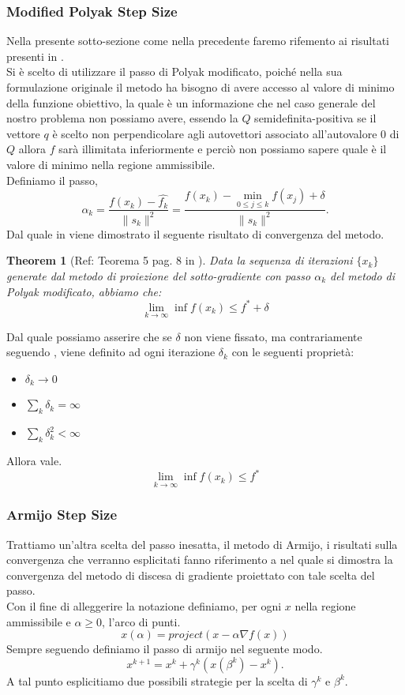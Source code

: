 \documentclass[12pt]{extarticle}
\newtheorem{theorem}{Theorem}[section]
\begin{document}
\subsubsection{Modified Polyak Step Size}
Nella presente sotto-sezione come nella precedente faremo rifemento ai risultati presenti in \cite{sgd_notes}.\\
Si è scelto di utilizzare il passo di Polyak modificato, poiché nella sua formulazione originale il metodo ha bisogno di avere accesso al valore di minimo della funzione obiettivo, la quale è un informazione che nel caso generale del nostro problema non possiamo avere, essendo la $Q$ semidefinita-positiva se il vettore $q$ è scelto non perpendicolare agli autovettori associato all'autovalore 0 di $Q$ allora $f$ sarà illimitata inferiormente e perciò non possiamo sapere quale è il valore di minimo nella regione ammissibile.\\
Definiamo il passo,
\[\alpha_k = \frac{f(x_k) - \hat{f_k}}{\|s_k\|^2} = \frac{f(x_k) - \min_{0 \leq j \leq k} f(x_j) + \delta}{\|s_k\|^2}.\]
Dal quale in \cite{sgd_notes} viene dimostrato il seguente risultato di convergenza del metodo.
\begin{theorem}[Ref: Teorema 5 pag. 8 in \cite{sgd_notes}]
Data la sequenza di iterazioni $\{x_k\}$ generate dal metodo di proiezione del sotto-gradiente con passo $\alpha_k$ del metodo di Polyak modificato, abbiamo che:
\[\lim_{k \to \infty} \inf f(x_k) \leq f^* + \delta\]
\end{theorem}
Dal quale possiamo asserire che se $\delta$ non viene fissato, ma contrariamente seguendo \cite{subgrad_method_slides}, viene definito ad ogni iterazione $\delta_k$ con le seguenti proprietà:\\
\begin{itemize}
    \item $\delta_k \to 0$
    \item $\sum_k \delta_k = \infty$
    \item $\sum_k \delta_k^2 < \infty$
\end{itemize}
Allora vale.
\[\lim_{k \to \infty} \inf f(x_k) \leq f^*\]
\subsubsection{Armijo Step Size}
Trattiamo un'altra scelta del passo inesatta, il metodo di Armijo, i risultati sulla convergenza che verranno esplicitati fanno riferimento a \cite{gafni1982convergence} nel quale si dimostra la convergenza del metodo di discesa di gradiente proiettato con tale scelta del passo.\\
Con il fine di alleggerire la notazione definiamo, per ogni $x$ nella regione ammissibile e $\alpha \geq 0$, l'arco di punti.
\[x(\alpha) = project(x - \alpha \nabla f(x))\]
Sempre seguendo \cite{gafni1982convergence} definiamo il passo di armijo nel seguente modo.
\[x^{k+1} = x^k + \gamma^k (x(\beta^k) - x^k).\]
A tal punto esplicitiamo due possibili strategie per la scelta di $\gamma^k$ e $\beta^k$.\\
\end{document}
